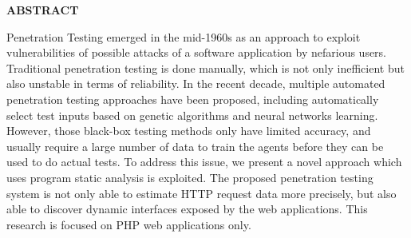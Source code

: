\clearpage
\begin{centering}
\textbf{ABSTRACT}\\
\vspace{\baselineskip}
\end{centering}

Penetration Testing emerged in the mid-1960s as an approach to exploit vulnerabilities of possible attacks of a software application by nefarious users. Traditional penetration testing is done manually, which is not only inefficient but also unstable in terms of reliability. In the recent decade, multiple automated penetration testing approaches have been proposed, including automatically select test inputs based on genetic algorithms and neural networks learning. However, those black-box testing methods only have limited accuracy, and usually require a large number of data to train the agents before they can be used to do actual tests. To address this issue, we present a novel approach which uses program static analysis is exploited. The proposed penetration testing system is not only able to estimate HTTP request data more precisely, but also able to discover dynamic interfaces exposed by the web applications. This research is focused on PHP web applications only.


